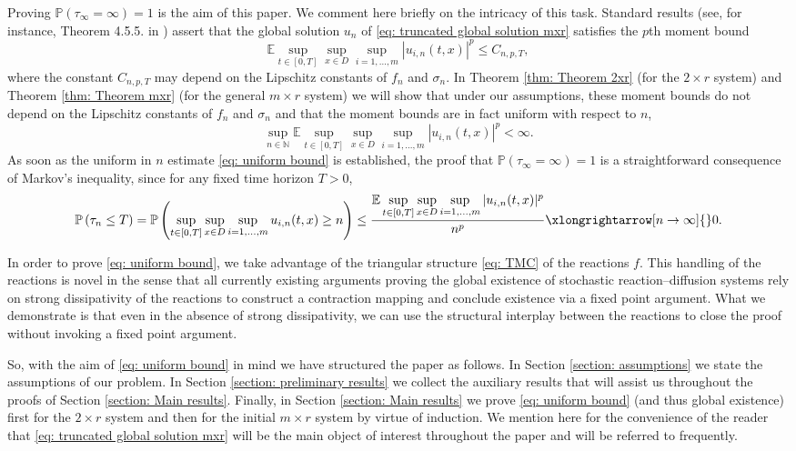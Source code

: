 \documentclass[12pt]{article}
\theoremstyle{definition}
\theoremstyle{remark}
\begin{document}
Proving $\mathbb P(\tau_{\infty} = \infty) = 1$ is the aim of this paper. We comment here briefly on the intricacy of this task. Standard results (see, for instance, Theorem 4.5.5. in \cite{dalang2026stochastic}) assert that the global solution $u_n$ of \eqref{eq: truncated global solution mxr} satisfies the $p$th moment bound
\begin{equation}\label{eq: pth moment bound}
\mathbb E \sup_{t\in [0,T]}\sup_{x\in D}\sup_{i=1,...,m} |u_{i,n}(t,x)|^p \leq C_{n,p,T},
\end{equation}
where the constant $C_{n,p,T}$ may depend on the Lipschitz constants of $f_n$ and $\sigma_n$. In Theorem \ref{thm: Theorem 2xr} (for the $2\times r$ system) and Theorem \ref{thm: Theorem mxr} (for the general $m\times r$ system) we will show that under our assumptions, these moment bounds do not depend on the Lipschitz constants of $f_n$ and $\sigma_n$ and that the moment bounds are in fact uniform with respect to $n$,
\begin{equation}\label{eq: uniform bound}
\sup_{n\in \mathbb N} \mathbb E \sup_{t\in [0,T]}\sup_{x\in D}\sup_{i=1,...,m} |u_{i,n}(t,x)|^p < \infty.
\end{equation}
As soon as the uniform in $n$ estimate \eqref{eq: uniform bound} is established, the proof that $\mathbb P(\tau_{\infty} = \infty)=1$ is a straightforward consequence of Markov's inequality, since for any fixed time horizon $T>0$,
\[
\mathbb P\left( \tau_n\leq T\right) =\mathbb P\left( \sup\limits_{t\in [0,T]}\sup_{x\in D}\sup\limits_{i=1,...,m} u_{i,n}(t,x)\geq n\right) \leq \frac{\mathbb E\sup\limits_{t\in [0,T]}\sup\limits_{x\in D}\sup\limits_{i=1,...,m} |u_{i,n}(t,x)|^p}{n^p} \xlongrightarrow[n\rightarrow \infty]{} 0.
\]

In order to prove \eqref{eq: uniform bound}, we take advantage of the triangular structure \eqref{eq: TMC} of the reactions $f$. This handling of the reactions is novel in the sense that all currently existing arguments proving the global existence of stochastic reaction--diffusion systems rely on strong dissipativity of the reactions to construct a contraction mapping and conclude existence via a fixed point argument. What we demonstrate is that even in the absence of strong dissipativity, we can use the structural interplay between the reactions to close the proof without invoking a fixed point argument.

So, with the aim of  \eqref{eq: uniform bound} in mind we have structured the paper as follows. In Section \ref{section: assumptions} we state the assumptions of our problem. In Section \ref{section: preliminary results} we collect the auxiliary results that will assist us throughout the proofs of Section \ref{section: Main results}. Finally, in Section \ref{section: Main results} we prove \eqref{eq: uniform bound} (and thus global existence) first for the $2\times r$ system and then for the initial $m\times r$ system by virtue of induction. We mention here for the convenience of the reader that \eqref{eq: truncated global solution mxr} will be the main object of interest throughout the paper and will be referred to frequently.
\end{document}
